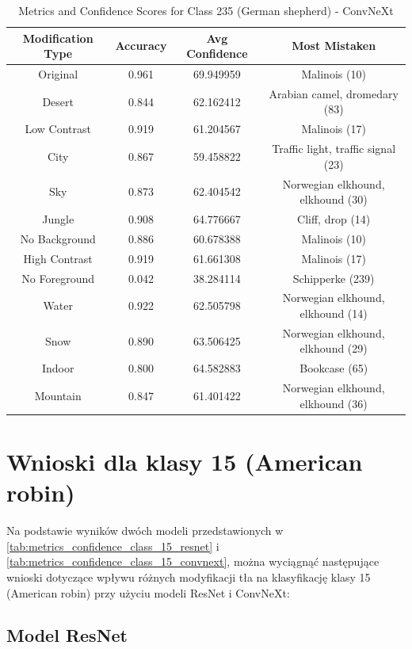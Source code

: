 \begin{table}
	\centering
	\begin{tabular}{|c|c|c|c|}
		\hline
		\textbf{Modification Type} & \textbf{Accuracy} & \textbf{Avg Confidence} & \textbf{Most Mistaken} \\
		\hline
		Original & 0.961 & 69.949959 & Malinois (10) \\
		\hline
		Desert & 0.844 & 62.162412 & Arabian camel, dromedary (83) \\
		\hline
		Low Contrast & 0.919 & 61.204567 & Malinois (17) \\
		\hline
		City & 0.867 & 59.458822 & Traffic light, traffic signal (23) \\
		\hline
		Sky & 0.873 & 62.404542 & Norwegian elkhound, elkhound (30) \\
		\hline
		Jungle & 0.908 & 64.776667 & Cliff, drop (14) \\
		\hline
		No Background & 0.886 & 60.678388 & Malinois (10) \\
		\hline
		High Contrast & 0.919 & 61.661308 & Malinois (17) \\
		\hline
		No Foreground & 0.042 & 38.284114 & Schipperke (239) \\
		\hline
		Water & 0.922 & 62.505798 & Norwegian elkhound, elkhound (14) \\
		\hline
		Snow & 0.890 & 63.506425 & Norwegian elkhound, elkhound (29) \\
		\hline
		Indoor & 0.800 & 64.582883 & Bookcase (65) \\
		\hline
		Mountain & 0.847 & 61.401422 & Norwegian elkhound, elkhound (36) \\
		\hline
	\end{tabular}
	\caption{Metrics and Confidence Scores for Class 235 (German shepherd) - ConvNeXt}
	\label{tab:metrics_confidence_class_235_convnext}
\end{table}

\section*{Wnioski dla klasy 15 (American robin)}

Na podstawie wyników dwóch modeli przedstawionych w \ref*{tab:metrics_confidence_class_15_resnet} i \ref*{tab:metrics_confidence_class_15_convnext}, można wyciągnąć następujące wnioski dotyczące wpływu różnych 
modyfikacji tła na klasyfikację klasy 15 (American robin) przy użyciu modeli ResNet i ConvNeXt:

\subsection*{Model ResNet}

